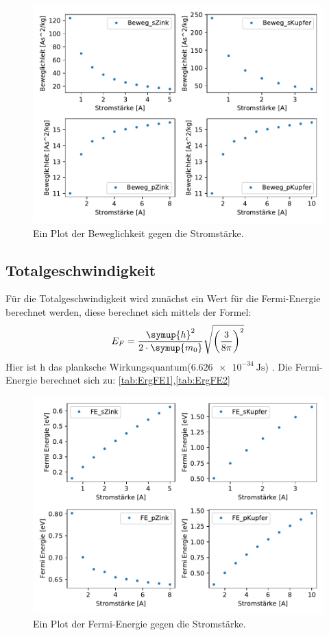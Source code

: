     \begin{figure}[H]
        \centering
        \includegraphics[width=1.1\textwidth]{build/Beweglichkeit.pdf}
        \caption{Ein Plot der Beweglichkeit gegen die Stromstärke.}
        \label{img:Beweg}
    \end{figure}


    \subsection{Totalgeschwindigkeit}


    Für die Totalgeschwindigkeit wird zunächst ein Wert für die Fermi-Energie berechnet werden, diese berechnet sich mittels der Formel:
    \begin{equation}
        E_F = \frac{\symup{h}^2}{2 \cdot \symup{m_0}}\sqrt{\left(\frac{3}{8\pi}\right)^2} \nonumber
    \end{equation}
    Hier ist h das planksche Wirkungsquantum($\SI{6.626e-34}{\joule\second}$) \cite{Planck}.
    Die Fermi-Energie berechnet sich zu: \ref{tab:ErgFE1},\ref{tab:ErgFE2}

    \begin{figure}[H]
        \centering
        \includegraphics[width=1.1\textwidth]{build/Fermi.pdf}
        \caption{Ein Plot der Fermi-Energie gegen die Stromstärke.}
        \label{img:FE}
    \end{figure}

